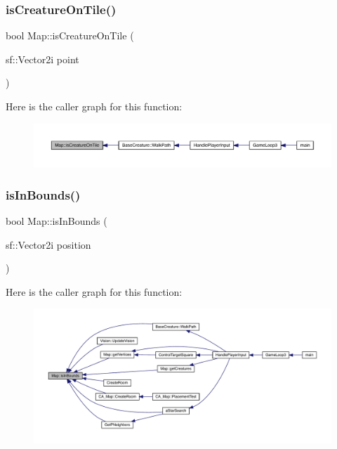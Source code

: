 \subsubsection{\texorpdfstring{is\+Creature\+On\+Tile()}{isCreatureOnTile()}}
{\footnotesize\ttfamily bool Map\+::is\+Creature\+On\+Tile (\begin{DoxyParamCaption}\item[{sf\+::\+Vector2i}]{point }\end{DoxyParamCaption})}

Here is the caller graph for this function\+:
\nopagebreak
\begin{figure}[H]
\begin{center}
\leavevmode
\includegraphics[width=350pt]{dd/d11/class_map_a22f7804f69757183a8b7093cf5b136ac_icgraph}
\end{center}
\end{figure}
\mbox{\label{class_map_aaf32aa299155bde102ea974acee38b3d}} 
\subsubsection{\texorpdfstring{is\+In\+Bounds()}{isInBounds()}}
{\footnotesize\ttfamily bool Map\+::is\+In\+Bounds (\begin{DoxyParamCaption}\item[{sf\+::\+Vector2i}]{position }\end{DoxyParamCaption})}

Here is the caller graph for this function\+:
\nopagebreak
\begin{figure}[H]
\begin{center}
\leavevmode
\includegraphics[width=350pt]{dd/d11/class_map_aaf32aa299155bde102ea974acee38b3d_icgraph}
\end{center}
\end{figure}
\mbox{\label{class_map_a4e045e2e1df74c3fcba4b860f240d498}} 

